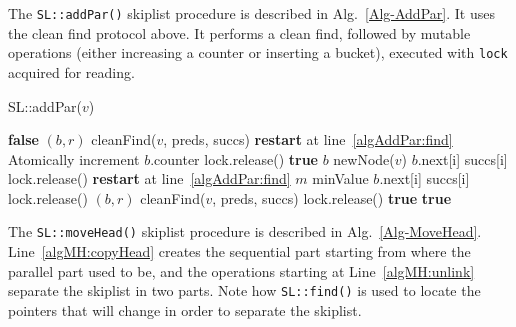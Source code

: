 The \texttt{SL::addPar()} skiplist procedure is described in Alg.~\ref{Alg-AddPar}. It uses the clean find protocol above. It performs a clean find, followed by mutable operations (either increasing a counter or inserting a bucket), executed with \texttt{lock} acquired for reading.

\begin{algorithm}[!htb]
\caption{SL::addPar($v$)}
\label{Alg-AddPar}
\begin{algorithmic}[1]
	\State \Return \textbf{false}
\EndIf
\State $(b,r)$ \attr cleanFind($v$, preds, succs) \label{algAddPar:find}
	\State \textbf{restart} at line~\ref{algAddPar:find}
\EndIf
{} \label{algAddPar:incblock}
	\State Atomically increment $b$.counter
	\State lock.release()
	\State \Return \textbf{true}
\EndIf
\State $b$ \attr newNode($v$)
	\State $b$.next[i] \attr succs[i]
\EndFor
{}
	\State lock.release()
	\State \textbf{restart} at line~\ref{algAddPar:find}
\EndIf
\Repeat
	\State $m$ \attr minValue
	\State $b$.next[i] \attr succs[i]
		\State \Continue
	\EndIf
	\State lock.release()
	\Repeat
		\State $(b,r)$ \attr cleanFind($v$, preds, succs)
		\State lock.release()
		\State \Return \textbf{true}
	\EndIf
\EndFor
\State \Return \textbf{true}
\end{algorithmic}
\end{algorithm}

The \texttt{SL::moveHead()} skiplist procedure is described in Alg.~\ref{Alg-MoveHead}. Line~\ref{algMH:copyHead} creates the sequential part starting from where the parallel part used to be, and the operations starting at Line~\ref{algMH:unlink} separate the skiplist in two parts. Note how \texttt{SL::find()} is used to locate the pointers that will change in order to separate the skiplist.

